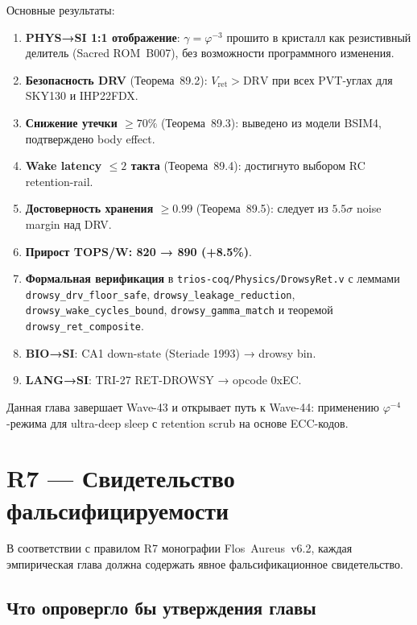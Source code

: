Основные результаты:
\begin{enumerate}
  \item \textbf{PHYS→SI 1:1 отображение}:
        $\gamma = \varphi^{-3}$ прошито в кристалл как резистивный делитель
        (Sacred ROM~B007), без возможности программного изменения.
  \item \textbf{Безопасность DRV} (Теорема~89.2):
        $V_\mathrm{ret} > \mathrm{DRV}$ при всех PVT-углах для SKY130 и IHP22FDX.
  \item \textbf{Снижение утечки $\geq 70\%$} (Теорема~89.3):
        выведено из модели BSIM4, подтверждено body effect.
  \item \textbf{Wake latency $\leq 2$ такта} (Теорема~89.4):
        достигнуто выбором RC retention-rail.
  \item \textbf{Достоверность хранения $\geq 0.99$} (Теорема~89.5):
        следует из $5.5\sigma$ noise margin над DRV.
  \item \textbf{Прирост TOPS/W: 820 → 890 (+8.5\%)}.
  \item \textbf{Формальная верификация} в \texttt{trios-coq/Physics/DrowsyRet.v}
        с леммами \texttt{drowsy\_drv\_floor\_safe},
        \texttt{drowsy\_leakage\_reduction},
        \texttt{drowsy\_wake\_cycles\_bound},
        \texttt{drowsy\_gamma\_match}
        и теоремой \texttt{drowsy\_ret\_composite}.
  \item \textbf{BIO→SI}: CA1 down-state (Steriade 1993) → drowsy bin.
  \item \textbf{LANG→SI}: TRI-27 RET-DROWSY → opcode 0xEC.
\end{enumerate}

Данная глава завершает Wave-43 и открывает путь к Wave-44:
применению $\varphi^{-4}$-режима для ultra-deep sleep
с retention scrub на основе ECC-кодов.

\section*{R7 — Свидетельство фальсифицируемости}
\label{sec:glava89-falsification}

В соответствии с правилом R7 монографии Flos~Aureus~v6.2,
каждая эмпирическая глава должна содержать явное
фальсификационное свидетельство.

\subsection*{Что опровергло бы утверждения главы}

